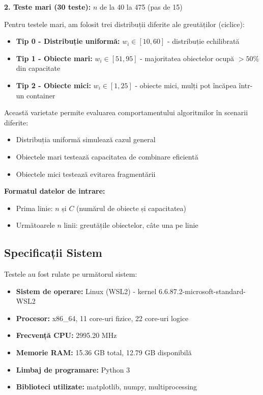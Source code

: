 \documentclass[runningheads]{llncs}
\begin{document}
\textbf{2. Teste mari (30 teste):} $n$ de la 40 la 475 (pas de 15)

Pentru testele mari, am folosit trei distribuții diferite ale greutăților (ciclice):
\begin{itemize}
    \item \textbf{Tip 0 - Distribuție uniformă:} $w_i \in [10, 60]$ - distribuție echilibrată
    \item \textbf{Tip 1 - Obiecte mari:} $w_i \in [51, 95]$ - majoritatea obiectelor ocupă $>50\%$ din capacitate
    \item \textbf{Tip 2 - Obiecte mici:} $w_i \in [1, 25]$ - obiecte mici, mulți pot încăpea într-un container
\end{itemize}

Această varietate permite evaluarea comportamentului algoritmilor în scenarii diferite:
\begin{itemize}
    \item Distribuția uniformă simulează cazul general
    \item Obiectele mari testează capacitatea de combinare eficientă
    \item Obiectele mici testează evitarea fragmentării
\end{itemize}

\textbf{Formatul datelor de intrare:}
\begin{itemize}
    \item Prima linie: $n$ și $C$ (numărul de obiecte și capacitatea)
    \item Următoarele $n$ linii: greutățile obiectelor, câte una pe linie
\end{itemize}

\subsection{Specificații Sistem}

Testele au fost rulate pe următorul sistem:
\begin{itemize}
    \item \textbf{Sistem de operare:} Linux (WSL2) - kernel 6.6.87.2-microsoft-standard-WSL2
    \item \textbf{Procesor:} x86\_64, 11 core-uri fizice, 22 core-uri logice
    \item \textbf{Frecvență CPU:} 2995.20 MHz
    \item \textbf{Memorie RAM:} 15.36 GB total, 12.79 GB disponibilă
    \item \textbf{Limbaj de programare:} Python 3
    \item \textbf{Biblioteci utilizate:} matplotlib, numpy, multiprocessing
\end{itemize}
\end{document}
